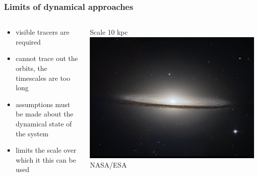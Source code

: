 \documentclass{beamer}
\begin{document}
\frame
{
    \frametitle{Limits of dynamical approaches}

    \begin{columns}
        \begin{column}{0.5\textwidth}    
            \begin{itemize}

                \item visible tracers are required
                \item cannot trace out the orbits, the timescales are too long
                \item assumptions must be made about the dynamical state of the system
                \item limits the scale over which it this can be used

            \end{itemize}
        \end{column}
        \begin{column}{0.5\textwidth}
            \begin{center}
                {\small Scale 10 kpc}
                \includegraphics[width=\textwidth]{m104-2013-03-01-HLA-5238-HLA-crop-scaled.jpg}
                \newline
                {\tiny NASA/ESA}
            \end{center}
        \end{column}
    \end{columns}
}
\end{document}

